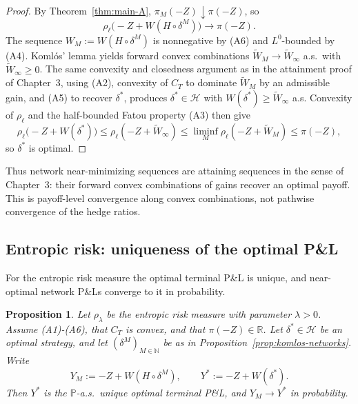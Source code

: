 \documentclass[11pt,a4paper]{report}
\numberwithin{equation}{chapter}
\theoremstyle{plain}
\newtheorem{proposition}{Proposition}[chapter]
\theoremstyle{definition}
\newcommand{\PP}{\mathbb{P}}
\newcommand{\R}{\mathbb{R}}
\newcommand{\N}{\mathbb{N}}
\newcommand{\HH}{\mathcal{H}}
\begin{document}
\begin{proof}
    By Theorem~\ref{thm:main-A}, $\pi_M(-Z)\downarrow\pi(-Z)$, so
    \[
        \rho_\ell\bigl(-Z+W(H\circ\delta^M)\bigr)\longrightarrow\pi(-Z).
    \]
    The sequence $W_M:=W(H\circ\delta^M)$ is nonnegative by (A6) and $L^0$-bounded by (A4). Koml\'os' lemma yields forward convex combinations $\widetilde W_M\to\widetilde W_\infty$ a.s.\ with $\widetilde W_\infty\ge0$. The same convexity and closedness argument as in the attainment proof of Chapter~3, using (A2), convexity of $C_T$ to dominate $\widetilde W_M$ by an admissible gain, and (A5) to recover $\delta^*$, produces $\delta^*\in\HH$ with $W(\delta^*)\ge\widetilde W_\infty$ a.s. Convexity of $\rho_\ell$ and the half-bounded Fatou property (A3) then give
    \[
        \rho_\ell\bigl(-Z+W(\delta^*)\bigr)\le\rho_\ell(-Z+\widetilde W_\infty)\le\liminf_M\rho_\ell(-Z+\widetilde W_M)\le\pi(-Z),
    \]
    so $\delta^*$ is optimal.
\end{proof}

Thus network near-minimizing sequences are attaining sequences in the sense of Chapter~3: their forward convex combinations of gains recover an optimal payoff. This is payoff-level convergence along convex combinations, not pathwise convergence of the hedge ratios.

\subsection*{Entropic risk: uniqueness of the optimal P\&L}

For the entropic risk measure the optimal terminal P\&L is unique, and near-optimal network P\&Ls converge to it in probability.

\begin{proposition}\label{prop:entropic-PnL}
    Let $\rho_\lambda$ be the entropic risk measure with parameter $\lambda>0$. Assume \textup{(A1)}-\textup{(A6)}, that $C_T$ is convex, and that $\pi(-Z)\in\R$. Let $\delta^*\in\HH$ be an optimal strategy, and let $(\delta^M)_{M\in\N}$ be as in Proposition~\ref{prop:komlos-networks}. Write
    \[
        Y_M:=-Z+W(H\circ\delta^M),\qquad Y^*:=-Z+W(\delta^*).
    \]
    Then $Y^*$ is the $\PP$-a.s.\ unique optimal terminal P\&L, and $Y_M\to Y^*$ in probability.
\end{proposition}
\end{document}
